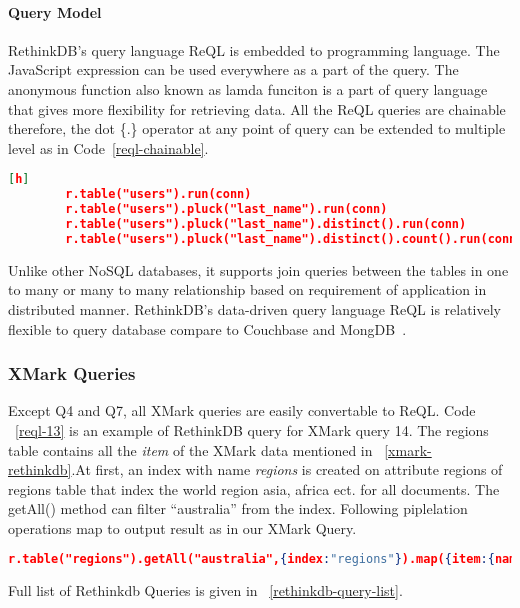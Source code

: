\paragraph{Query Model}
	RethinkDB's query language ReQL is embedded to programming language. The JavaScript expression can be used everywhere as a part of the query. The anonymous function also known as lamda funciton is a part of query language that gives more flexibility for retrieving data. All the ReQL queries are chainable therefore, the dot \{.\} operator at any point of query can be extended to multiple level as in Code~\ref{reql-chainable}.
	\begin{lstlisting}[language=JSON,caption=Chainable Query in ReQL, label=reql-chainable, xleftmargin=-40pt][h]
		r.table("users").run(conn)
		r.table("users").pluck("last_name").run(conn)
		r.table("users").pluck("last_name").distinct().run(conn)
		r.table("users").pluck("last_name").distinct().count().run(conn)
	\end{lstlisting} 

Unlike other NoSQL databases, it supports join queries between the tables in one to many or many to many relationship based on requirement of application in distributed manner. 
RethinkDB's data-driven query language  ReQL is relatively flexible to query database compare to Couchbase and MongDB~\cite{rethinkdbcompare}.
\subsubsection{XMark Queries}
Except Q4 and Q7, all XMark queries are easily convertable to ReQL. Code ~\ref{reql-13} is an example of RethinkDB query for XMark query 14. The regions table contains all the \textit{item} of the XMark data mentioned in ~\ref{xmark-rethinkdb}.At first,  an index with name \textit{regions} is created on  attribute regions  of regions table that index the world region asia, africa ect. for all documents. The getAll() method can filter “australia” from the index. Following piplelation operations map to output result as in our XMark Query. 
\begin{lstlisting}[language=JSON, caption=ReQL query of XMark query 13,label=reql-13]
	   r.table("regions").getAll("australia",{index:"regions"}).map({item:{name:r.row("name"),description:r.row("description")}})
	\end{lstlisting}
Full list of Rethinkdb Queries is given in ~\ref{rethinkdb-query-list}. 



